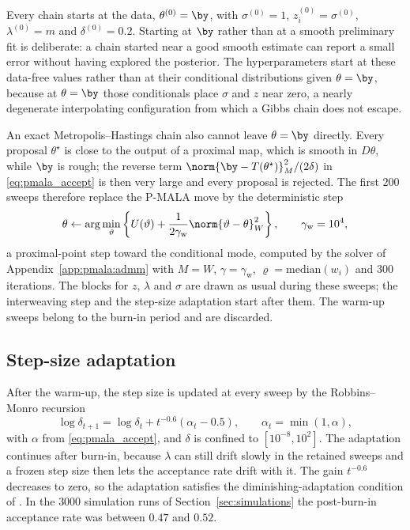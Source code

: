 Every chain starts at the data, $\theta^{(0)} = \by$, with $\sigma^{(0)} = 1$, $z_i^{(0)} = \sigma^{(0)}$, $\lambda^{(0)} = m$ and $\delta^{(0)} = 0.2$. Starting at $\by$ rather than at a smooth preliminary fit is deliberate: a chain started near a good smooth estimate can report a small error without having explored the posterior. The hyperparameters start at these data-free values rather than at their conditional distributions given $\theta = \by$, because at $\theta = \by$ those conditionals place $\sigma$ and $z$ near zero, a nearly degenerate interpolating configuration from which a Gibbs chain does not escape.

An exact Metropolis--Hastings chain also cannot leave $\theta = \by$ directly. Every proposal $\theta^\star$ is close to the output of a proximal map, which is smooth in $D\theta$, while $\by$ is rough; the reverse term $\norm{\by - T(\theta^\star)}_M^2/(2\delta)$ in \eqref{eq:pmala_accept} is then very large and every proposal is rejected. The first $200$ sweeps therefore replace the P-MALA move by the deterministic step
\[
\theta \leftarrow \arg\min_{\vartheta}\left\{U(\vartheta) + \frac{1}{2\gamma_{\mathrm{w}}}\norm{\vartheta - \theta}_W^2\right\}, \qquad \gamma_{\mathrm{w}} = 10^4,
\]
a proximal-point step toward the conditional mode, computed by the solver of Appendix~\ref{app:pmala:admm} with $M = W$, $\gamma = \gamma_{\mathrm{w}}$, $\varrho = \mathrm{median}(w_i)$ and $300$ iterations. The blocks for $z$, $\lambda$ and $\sigma$ are drawn as usual during these sweeps; the interweaving step and the step-size adaptation start after them. The warm-up sweeps belong to the burn-in period and are discarded.

\subsection{Step-size adaptation}
\label{app:pmala:adapt}

After the warm-up, the step size is updated at every sweep by the Robbins--Monro recursion
\[
\log\delta_{t+1} = \log\delta_t + t^{-0.6}\left(\alpha_t - 0.5\right), \qquad \alpha_t = \min(1, \alpha),
\]
with $\alpha$ from \eqref{eq:pmala_accept}, and $\delta$ is confined to $[10^{-8}, 10^{2}]$. The adaptation continues after burn-in, because $\lambda$ can still drift slowly in the retained sweeps and a frozen step size then lets the acceptance rate drift with it. The gain $t^{-0.6}$ decreases to zero, so the adaptation satisfies the diminishing-adaptation condition of \citet{roberts2007coupling}. In the $3000$ simulation runs of Section~\ref{sec:simulations} the post-burn-in acceptance rate was between $0.47$ and $0.52$.

